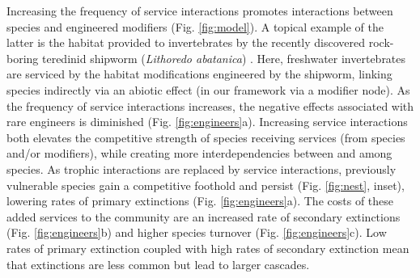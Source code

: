 \documentclass[twocolumn,preprintnumbers,amsmath,amssymb,superscriptaddress,linenumbers]{revtex4-1}
\begin{document}


Increasing the frequency of service interactions promotes interactions between species and engineered modifiers (Fig. \ref{fig:model}).
A topical example of the latter is the habitat provided to invertebrates by the recently discovered rock-boring teredinid shipworm (\emph{Lithoredo abatanica}) \cite{Shipway2019}.
Here, freshwater invertebrates are serviced by the habitat modifications engineered by the shipworm, linking species indirectly via an abiotic effect (in our framework via a modifier node).
As the frequency of service interactions increases, the negative effects associated with rare engineers is diminished (Fig. \ref{fig:engineers}a).
Increasing service interactions both elevates the competitive strength of species receiving services (from species and/or modifiers), while creating more interdependencies between and among species.
As trophic interactions are replaced by service interactions, previously vulnerable species gain a competitive foothold and persist (Fig. \ref{fig:nest}, inset), lowering rates of primary extinctions (Fig. \ref{fig:engineers}a). %
The costs of these added services to the community are an increased rate of secondary extinctions (Fig. \ref{fig:engineers}b) and higher species turnover (Fig. \ref{fig:engineers}c).
Low rates of primary extinction coupled with high rates of secondary extinction mean that extinctions are less common but lead to larger cascades.

\end{document}
